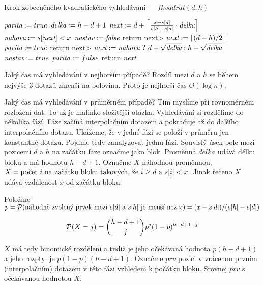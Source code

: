 \begin{algorithm}
\caption{Krok zobecněného kvadratického vyhledávání --- $fkvadrat(d,h)$}
\label{alg:kvadratic}
\begin{algorithmic}
\STATE {}
\STATE {}
\STATE {}
	\STATE $\<parita> := true$
	\STATE $\<delka> := h-d+1$
	\STATE $\<next> := d + \left\lceil \frac{ x-s[d] }{ s[h]-s[d] } 
						\cdot \<delka> \right\rceil$
	\STATE $\<nahoru> := s[\<next>] < x$
	\STATE $\<nastav> := \<false>$
	\STATE return \<next>
\ENDIF
{}
	\STATE $\<next> := \lceil (d+h)/2 \rceil$ 
	\STATE $\<parita> := true$
	\STATE return \<next>
\ENDIF
\STATE $\<next> := \<nahoru>\ ?\ d+\sqrt{\<delka>} : h-\sqrt{\<delka>}$
	\STATE $\<nastav> := true$
\ELSE
	\STATE $\<parita> := false$
\ENDIF
\STATE return $\<next>$
\end{algorithmic}
\end{algorithm}

Jaký čas má vyhledávání v nejhorším případě? Rozdíl mezi $d$ a $h$ se během nejvýše 3 dotazů zmenší
na polovinu. Proto je nejhorší čas $O(\log n)$.

 
Jaký čas má vyhledávání v průměrném případě? Tím myslíme při rovnoměrném 
rozložení dat. To už je malinko složitější otázka.
Vyhledávání si rozdělíme do několika fází. Fáze začíná interpolačním dotazem a
pokračuje až do dalšího interpolačního dotazu. Ukážeme, že v jedné fázi se
položí v průměru jen konstantně dotazů. Pojďme tedy zanalyzovat jednu fázi.
Souvislý úsek pole mezi pozicemi $d$ a $h$ na začátku fáze označme jako blok.
Proměnná $delka$ udává délku bloku a má hodnotu $h-d+1$.
Označme $X$ náhodnou proměnnou, $X=\hbox{počet $i$ na začátku bloku takových, že }i\ge
d \hbox{ a } s[i]<x$. Jinak řečeno $X$ udává vzdálenost $x$ od začátku bloku.

Položme $p={\cal P}(\hbox{náhodně zvolený prvek mezi $s[d]$ a $s[h]$ je
menší než }x)={(x-s[d])}/{(s[h]-s[d])}$

$${\cal P}(X=j) = \binom{h-d+1}{j} p^j (1-p)^{h-d+1-j}$$

$X$ má tedy binomické rozdělení a tudíž je jeho očekávaná hodnota
$p(h-d+1)$ a jeho rozptyl je $p(1-p)(h-d+1)$.
Označme $prv$ pozici v vrácenou prvním (interpolačním) dotazem v této fázi
vzhledem k počátku bloku. 
Srovnej $prv$ s očekávanou hodnotou $X$. 

